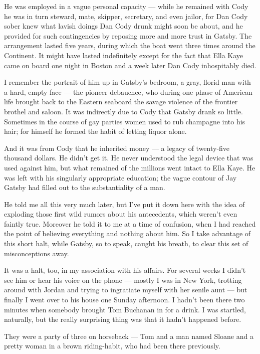 \documentclass{znotebook}
\begin{document}
He was employed in a vague personal capacity ---{} while he remained with Cody he was in turn steward, mate, skipper, secretary, and even jailor, for Dan Cody sober knew what lavish doings Dan Cody drunk might soon be about, and he provided for such contingencies by reposing more and more trust in Gatsby. The arrangement lasted five years, during which the boat went three times around the Continent. It might have lasted indefinitely except for the fact that Ella Kaye came on board one night in Boston and a week later Dan Cody inhospitably died.

I remember the portrait of him up in Gatsby's bedroom, a gray, florid man with a hard, empty face ---{} the pioneer debauchee, who during one phase of American life brought back to the Eastern seaboard the savage violence of the frontier brothel and saloon. It was indirectly due to Cody that Gatsby drank so little. Sometimes in the course of gay parties women used to rub champagne into his hair; for himself he formed the habit of letting liquor alone.

And it was from Cody that he inherited money ---{} a legacy of twenty-five thousand dollars. He didn't get it. He never understood the legal device that was used against him, but what remained of the millions went intact to Ella Kaye. He was left with his singularly appropriate education; the vague contour of Jay Gatsby had filled out to the substantiality of a man.

He told me all this very much later, but I've put it down here with the idea of exploding those first wild rumors about his antecedents, which weren't even faintly true. Moreover he told it to me at a time of confusion, when I had reached the point of believing everything and nothing about him. So I take advantage of this short halt, while Gatsby, so to speak, caught his breath, to clear this set of misconceptions away.

It was a halt, too, in my association with his affairs. For several weeks I didn't see him or hear his voice on the phone ---{} mostly I was in New York, trotting around with Jordan and trying to ingratiate myself with her senile aunt ---{} but finally I went over to his house one Sunday afternoon. I hadn't been there two minutes when somebody brought Tom Buchanan in for a drink. I was startled, naturally, but the really surprising thing was that it hadn't happened before.

They were a party of three on horseback ---{} Tom and a man named Sloane and a pretty woman in a brown riding-habit, who had been there previously.
\end{document}
